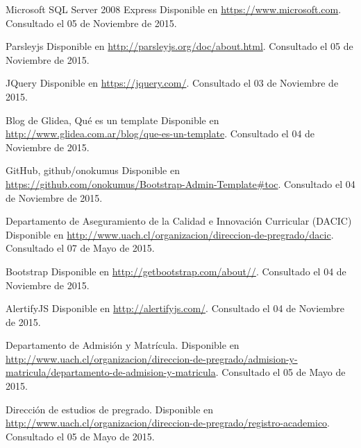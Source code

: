 \begin{spacing}{1.0}
\begin{thebibliography}{99}
\newblock Microsoft SQL Server 2008 Express 
\newblock Disponible en \url{https://www.microsoft.com}.
\newblock Consultado el 05 de Noviembre de 2015.

\newblock Parsleyjs
\newblock Disponible en \url{http://parsleyjs.org/doc/about.html}.
\newblock Consultado el 05 de Noviembre de 2015.

\newblock JQuery
\newblock Disponible en \url{https://jquery.com/}.
\newblock Consultado el 03 de Noviembre de 2015.

\newblock Blog de Glidea, Qué es un template
\newblock Disponible en \url{http://www.glidea.com.ar/blog/que-es-un-template}.
\newblock Consultado el 04 de Noviembre de 2015.

\newblock GitHub, github/onokumus
\newblock Disponible en \url{https://github.com/onokumus/Bootstrap-Admin-Template#toc}.
\newblock Consultado el 04 de Noviembre de 2015.

\newblock Departamento de Aseguramiento de la Calidad e Innovación Curricular (DACIC)
\newblock Disponible en \url{http://www.uach.cl/organizacion/direccion-de-pregrado/dacic}.
\newblock Consultado el 07 de Mayo de 2015.

\newblock Bootstrap
\newblock Disponible en \url{http://getbootstrap.com/about//}.
\newblock Consultado el 04 de Noviembre de 2015.

\newblock AlertifyJS
\newblock Disponible en \url{http://alertifyjs.com/}.
\newblock Consultado el 04 de Noviembre de 2015.

\newblock Departamento de Admisión y Matrícula.
\newblock Disponible en \url{http://www.uach.cl/organizacion/direccion-de-pregrado/admision-y-matricula/departamento-de-admision-y-matricula}.
\newblock Consultado el 05 de Mayo de 2015.


\newblock Dirección de estudios de pregrado.
\newblock Disponible en \url{http://www.uach.cl/organizacion/direccion-de-pregrado/registro-academico}.
\newblock Consultado el 05 de Mayo de 2015.





\end{thebibliography}	
\end{spacing}